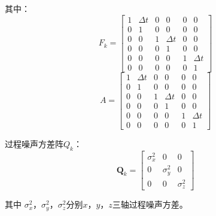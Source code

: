其中： 
\begin{equation} F_k =\left[\begin{array}{cccccc} 1 &  \Delta t & 0 &0&0&0\\ 0 &  1 & 0 &0&0&0\\ 0 & 0 & 1&  \Delta t & 0 &0\\ 0&0&   0&1 &0 &0\\ 0 &0& 0 &0& 1 &\Delta t \\ 0 &0& 0 & 0 &0 &1 \end{array}\right] \end{equation}
\begin{equation} A =\left[\begin{array}{cccccc} 1 &  \Delta t & 0 &0&0&0\\ 0 &  1 & 0 &0&0&0\\ 0 & 0 & 1&  \Delta t & 0 &0\\ 0&0&   0&1 &0 &0\\ 0 &0& 0 &0& 1 &\Delta t \\ 0 &0& 0 & 0 &0 &1 \end{array}\right] \end{equation}

过程噪声方差阵$Q_k$：
\begin{equation} \boldsymbol Q_k =\left[\begin{array}{ccc} \sigma_x^2 &  0 & 0 \\ 0 &  \sigma_y^2 & 0 \\ 0 & 0 & \sigma_z^2 \end{array}\right] \end{equation}
\par
其中 $\sigma_x^2$，$\sigma_y ^2$，$\sigma_z^2$分别$x$，$y$，$z$三轴过程噪声方差。
\par


